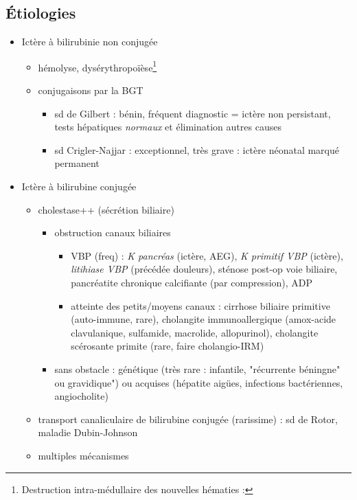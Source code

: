 \documentclass[11pt]{article}
\begin{document}
\subsection{Étiologies}
\label{sec:org10df51e}
\begin{itemize}
\item Ictère à bilirubinie non conjugée
\begin{itemize}
\item hémolyse, dysérythropoïèse\footnote{Destruction intra-médullaire des nouvelles hématies :}
\item \dec conjugaisons par la BGT
\begin{itemize}
\item sd de Gilbert : bénin, fréquent \thus diagnostic = ictère non persistant,
tests hépatiques \emph{normaux} et élimination autres causes
\item sd Crigler-Najjar : exceptionnel, très grave : ictère néonatal marqué permanent
\end{itemize}
\end{itemize}
\item Ictère à bilirubine conjugée
\begin{itemize}
\item cholestase++ (\dec sécrétion biliaire)
\begin{itemize}
\item obstruction canaux biliaires
\begin{itemize}
\item \gls{VBP} (freq) : \emph{K pancréas} (ictère, AEG), \emph{K primitif VBP} (ictère),
\emph{litihiase VBP} (précédée douleurs), sténose post-op voie biliaire,
pancréatite chronique calcifiante (par compression), ADP
\item atteinte des petits/moyens canaux : cirrhose biliaire primitive
(auto-immune, rare), cholangite immunoallergique (amox-acide
clavulanique, sulfamide, macrolide, allopurinol), cholangite scérosante
primite (rare, faire cholangio-IRM)
\end{itemize}
\item sans obstacle : génétique (très rare : infantile, "récurrente béningne" ou
gravidique") ou acquises (hépatite aigües, infections bactériennes, angiocholite)
\end{itemize}
\item transport canaliculaire de bilirubine conjugée (rarissime) : sd de Rotor,
maladie Dubin-Johnson
\item multiples mécanismes
\end{itemize}
\end{itemize}
\end{document}
